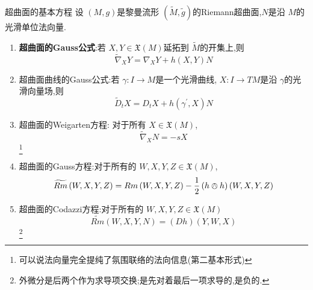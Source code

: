 \documentclass[../../几何与拓扑.tex]{subfiles}
\begin{document}
\begin{theorem}{超曲面的基本方程}
    设 \(  \left( M,g \right)   \)是黎曼流形 \(  \left( \tilde{M},\tilde{g} \right)   \)的Riemann超曲面,\(  N  \)是沿 \(  M  \)的光滑单位法向量. 
    \begin{enumerate}
        \item \textbf{超曲面的Gauss公式}:若 \(  X,Y \in \mathfrak{X}\left( M \right)   \)延拓到 \(  \tilde{M}  \)的开集上,则 \[
         \tilde{\nabla} _{X}Y=  \nabla _{X}Y+ h\left( X,Y \right)N 
        \]  
        \item 超曲面曲线的Gauss公式:若 \(   \gamma :I\to M  \)是一个光滑曲线, \(  X:I\to TM  \)是沿 \(   \gamma   \)的光滑向量场,则 \[
        \tilde{D}_{t}X= D_{t}X+ h\left(  \gamma ^{\prime} ,X \right)N 
        \]
        \item 超曲面的Weigarten方程: 对于所有 \(  X \in \mathfrak{X}\left( M \right)   \), \[
         \tilde{\nabla} _{X}N= -sX
        \]    \footnote{可以说法向量完全提纯了氛围联络的法向信息(第二基本形式)}
        \item 超曲面的Gauss方程:对于所有的 \(  W,X,Y,Z \in \mathfrak{X}\left( M \right)   \), \[
        \widetilde{Rm}\left( W,X,Y,Z \right)= Rm\left( W,X,Y,Z \right)-\frac{1}{2} \left( h \owedge h \right)\left( W,X,Y,Z \right)    
        \] 
        \item 超曲面的Codazzi方程:对于所有的 \(  W,X,Y,Z \in \mathfrak{X}\left( M \right)   \) \[
        \widetilde{Rm}\left( W,X,Y,N \right)= \left( Dh \right)\left( Y,W,X \right)   
        \] \footnote{外微分是后两个作为求导项交换;是先对着最后一项求导的,是负的.}
    \end{enumerate}
    
\end{theorem}
\end{document}
